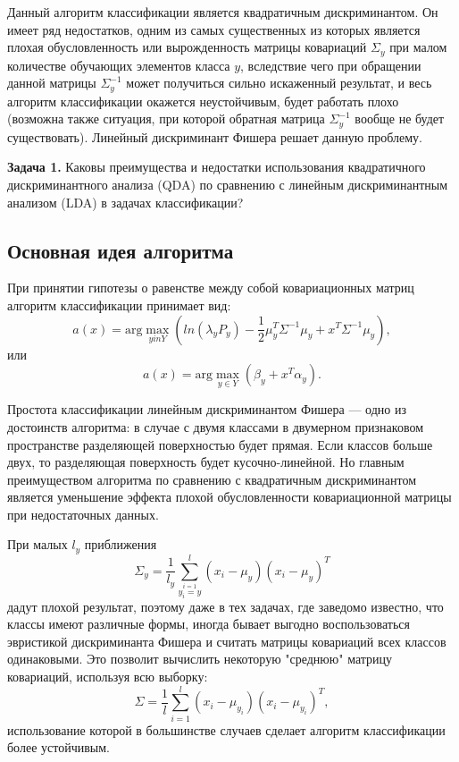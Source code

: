 Данный алгоритм классификации является квадратичным дискриминантом. Он имеет ряд недостатков, одним из самых существенных из которых является плохая обусловленность или вырожденность матрицы ковариаций $\Sigma_y$ при малом количестве обучающих элементов класса $y$, вследствие чего при обращении данной матрицы $\Sigma^{-1}_{y}$ может получиться сильно искаженный результат, и весь алгоритм классификации окажется неустойчивым, будет работать плохо (возможна также ситуация, при которой обратная матрица $\Sigma^{-1}_{y}$ вообще не будет существовать). Линейный дискриминант Фишера решает данную проблему.

\textbf{Задача 1.} Каковы преимущества и недостатки использования квадратичного дискриминантного анализа (QDA) по сравнению с линейным дискриминантным анализом (LDA) в задачах классификации?


\subsection*{Основная идея алгоритма}

При принятии гипотезы о равенстве между собой ковариационных матриц алгоритм классификации принимает вид:
\[
    a(x) = \mathrm{arg}\max_{yin Y} \left( ln(\lambda_{y} P_y) - \frac{1}{2}\mu_{y}^{T} \Sigma^{-1} \mu_y + x^T \Sigma^{-1} \mu_y \right),
\]
или
\[
    a(x) = \mathrm{arg}\max_{y\in Y} (\beta_y + x^T\alpha_y).
\]

Простота классификации линейным дискриминантом Фишера — одно из достоинств алгоритма: в случае с двумя классами в двумерном признаковом пространстве разделяющей поверхностью будет прямая. Если классов больше двух, то разделяющая поверхность будет кусочно-линейной. Но главным преимуществом алгоритма по сравнению с квадратичным дискриминантом является уменьшение эффекта плохой обусловленности ковариационной матрицы при недостаточных данных.

При малых $l_y$ приближения
\[
    \Sigma_y = \frac{1}{l_y} \sum^{l}_{\stackrel{i=1}{y_i = y}}(x_i - \mu_y)(x_i - \mu_y)^T
\]
дадут плохой результат, поэтому даже в тех задачах, где заведомо известно, что классы имеют различные формы, иногда бывает выгодно воспользоваться эвристикой дискриминанта Фишера и считать матрицы ковариаций всех классов одинаковыми. Это позволит вычислить некоторую "среднюю" матрицу ковариаций, используя всю выборку:
\[
    \Sigma = \frac{1}{l} \sum^{l}_{i=1}(x_i - \mu_{y_i})(x_i - \mu_{y_i})^T,
\]
использование которой в большинстве случаев сделает алгоритм классификации более устойчивым.

